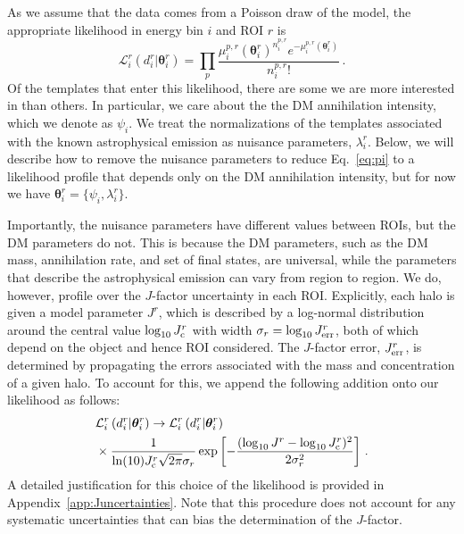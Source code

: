 As we assume that the data comes from a Poisson draw of the model, the appropriate likelihood in energy bin $i$ and ROI $r$ is
\begin{equation}
\mathcal{L}_i^r(d_i^r | {\boldsymbol \theta}_i^r) = \prod_p \frac{\mu_i^{p,r}({\boldsymbol \theta}_i^r)^{n_i^{p,r}} e^{-\mu_i^{p,r}({\boldsymbol \theta}_i^r)}}{n_i^{p,r}!}\,.
\label{eq:pi}
\end{equation}
Of the templates that enter this likelihood, there are some we are more interested in than others. In particular, we care about the the DM annihilation intensity, which we denote as $\psi_i$.  We treat the normalizations of the templates associated with the known astrophysical emission as nuisance parameters, $\lambda_i^r$. Below, we will describe how to remove the nuisance parameters to reduce Eq.~\ref{eq:pi} to a likelihood profile that depends only on the DM annihilation intensity, but for now we have ${\boldsymbol \theta}_i^r = \{ \psi_i, \lambda_i^r \}$.

Importantly, the nuisance parameters have different values between ROIs, but the DM parameters do not.  This is because the DM parameters, such as the DM mass, annihilation rate, and set of final states, are universal, while the parameters that describe the astrophysical emission can vary from region to region.
We do, however, profile over the $J$-factor uncertainty in each ROI.
Explicitly, each halo is given a model parameter $J^r$, which is described by a
log-normal distribution around the central value $\log_{10} J_{\rm c}^r$ with width $\sigma_r = \log_{10} J_{\rm err}^r$, both of which depend on the object and hence ROI considered.  The $J$-factor error, $J_{\rm err}^r$, is determined by propagating the errors associated with the mass and concentration of a given halo. To account for this, we append the following addition onto our likelihood as follows:
\begin{equation}\begin{aligned}
&\mathcal{L}_i^r \left( d_i^r | \boldsymbol{\theta}_i^r \right) \to \mathcal{L}_i^r \left( d_i^r | \boldsymbol{\theta}_i^r \right) \\
&\times \frac{1}{\ln(10) J_{\rm c}^r\sqrt{2\pi} \sigma_r} \exp \left[ - \frac{(\log_{10} J^r - \log_{10} J_{\rm c}^r)^2}{2\sigma_r^2} \right]\,.
\label{eq:Jlognormal}
\end{aligned}\end{equation}
A detailed justification for this choice of the likelihood is provided in Appendix~\ref{app:Juncertainties}.  Note that this procedure does not account for any systematic uncertainties that can bias the determination of the $J$-factor.


